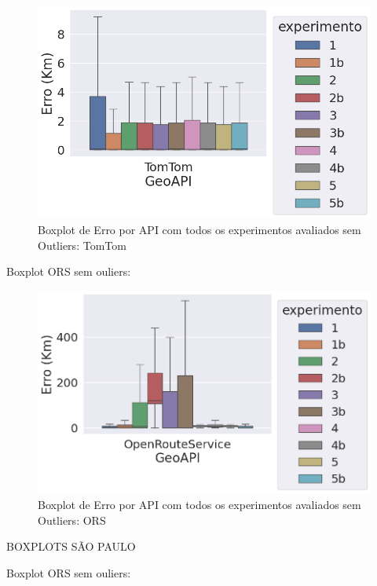\begin{figure}[h]
    \centering
    \includegraphics[width=\textwidth]{Figuras/boxplotApiTomtomSemOut.png}
    \caption{Boxplot de Erro por API com todos os experimentos avaliados sem Outliers: TomTom}
    \label{fig:boxplot-api-tomtom-semout}
\end{figure}

Boxplot ORS sem ouliers:

\begin{figure}[h]
    \centering
    \includegraphics[width=\textwidth]{Figuras/boxplotApiOrsSemOut.png}
    \caption{Boxplot de Erro por API com todos os experimentos avaliados sem Outliers: ORS}
    \label{fig:boxplot-api-ors-semout}
\end{figure}

BOXPLOTS SÃO PAULO

Boxplot ORS sem ouliers:

